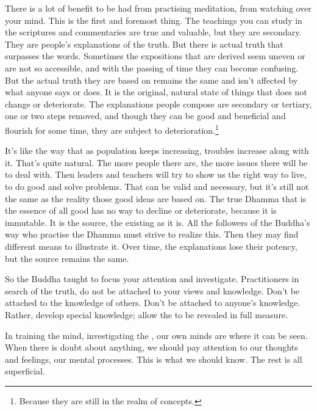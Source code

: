 There is a lot of benefit to be had from practising meditation, from watching over your mind. This is the first and foremost thing. The teachings you can study in the scriptures and commentaries are true and valuable, but they are secondary. They are people's explanations of the truth. But there is actual truth that surpasses the words. Sometimes the expositions that are derived seem uneven or are not so accessible, and with the passing of time they can become confusing. But the actual truth they are based on remains the same and isn't affected by what anyone says or does. It is the original, natural state of things that does not change or deteriorate. The explanations people compose are secondary or tertiary, one or two steps removed, and though they can be good and beneficial and flourish for some time, they are subject to deterioration.\footnote{Because they are still in the realm of concepts.} 

It's like the way that as population keeps increasing, troubles increase along with it. That's quite natural. The more people there are, the more issues there will be to deal with. Then leaders and teachers will try to show us the right way to live, to do good and solve problems. That can be valid and necessary, but it's still not the same as the reality those good ideas are based on. The true Dhamma that is the essence of all good has no way to decline or deteriorate, because it is immutable. It is the source, the  existing as it is. All the followers of the Buddha's way who practise the Dhamma must strive to realize this. Then they may find different means to illustrate it. Over time, the explanations lose their potency, but the source remains the same.

So the Buddha taught to focus your attention and investigate. Practitioners in search of the truth, do not be attached to your views and knowledge. Don't be attached to the knowledge of others. Don't be attached to anyone's knowledge. Rather, develop special knowledge; allow the  to be revealed in full measure.

In training the mind, investigating the , our own minds are where it can be seen. When there is doubt about anything, we should pay attention to our thoughts and feelings, our mental processes. This is what we should know. The rest is all superficial.


